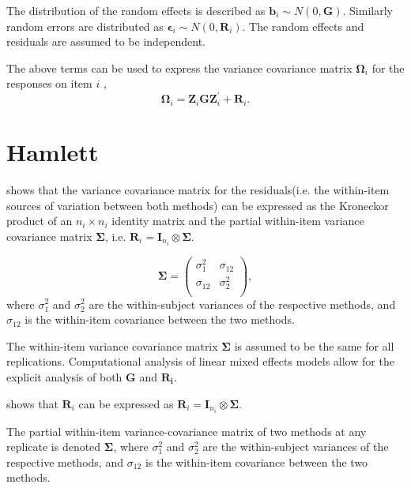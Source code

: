 \documentclass[12pt, a4paper]{report}
\theoremstyle{plain}
\theoremstyle{definition}
\theoremstyle{remark}
\begin{document}
The distribution of the random effects is described as $\boldsymbol{b}_i \sim N(0,\boldsymbol{G})$. Similarly  random errors are distributed as $\boldsymbol{\epsilon}_i \sim N(0,\boldsymbol{R}_i)$. The random effects and residuals are assumed to be independent.

The above terms can be used to express the  variance covariance matrix $\boldsymbol{\Omega}_i$ for the responses on item $i$ ,
\[
\boldsymbol{\Omega}_i = \boldsymbol{Z}_i \boldsymbol{G} \boldsymbol{Z}_i^{\prime} + \boldsymbol{R}_i.
\]

\section{Hamlett}
\citet{hamlett} shows that the variance covariance matrix for the residuals(i.e. the within-item sources of variation between both methods) can be expressed as the Kroneckor product of an $n_i \times n_i$ identity matrix and the partial within-item variance covariance matrix $\boldsymbol{\Sigma}$, i.e. $\boldsymbol{R}_{i} = \boldsymbol{I}_{n_{i}} \otimes \boldsymbol{\Sigma}$.

\[
\boldsymbol{\Sigma} = \left( \begin{array}{cc}
\sigma^2_{1} & \sigma_{12} \\
\sigma_{12} & \sigma^2_{2} \\
\end{array}\right),
\]
where $\sigma^2_{1}$ and $\sigma^2_{2}$ are the within-subject variances of the respective methods, and $\sigma_{12}$ is the within-item covariance between the two methods. 

The within-item variance covariance matrix $\boldsymbol{\Sigma}$ is assumed to be the same for all replications. Computational analysis of linear mixed effects models allow for the explicit analysis of both $\boldsymbol{G}$ and $\boldsymbol{R_i}$.


\citet{hamlett} shows that $\boldsymbol{R}_{i}$  can be expressed as $\boldsymbol{R}_{i} = \boldsymbol{I}_{n_{i}} \otimes \boldsymbol{\Sigma}$. 

The partial within-item variance-covariance matrix of two methods at any replicate is denoted $\boldsymbol{\Sigma}$, where $\sigma^2_{1}$ and $\sigma^2_{2}$ are the within-subject variances of the respective methods, and $\sigma_{12}$ is the within-item covariance between the two methods. 
\end{document}
